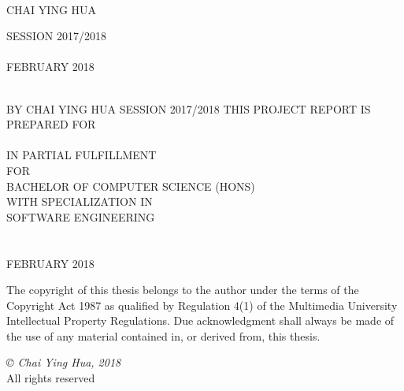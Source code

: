 \documentclass[12pt, oneside]{Thesis}
\begin{document}
\begin{titlepage}
\begin{center}

{\LARGE \ttitle}\\[0.4cm] 
\vfill
\Large{CHAI YING HUA} 

\vfill
\normalsize{SESSION 2017/2018}
\vfill
\normalsize\FACNAME\\
\normalsize \UNIVNAME\\
{\normalsize FEBRUARY 2018}\\ 
\vfill
\end{center}

\end{titlepage}
\thispagestyle{empty}
\begin{center}

	{\LARGE \ttitle}\\[0.4cm] %
	\vfill
	\footnotesize{BY}
	\vfill
	\Large{CHAI YING HUA} %
	\vfill
	\footnotesize{SESSION 2017/2018}
	\vfill
	\footnotesize{THIS PROJECT REPORT IS PREPARED FOR}
	\vfil
	\normalsize\FACNAME\\
	\normalsize \UNIVNAME\\
	\normalsize{IN PARTIAL FULFILLMENT}\\
	\normalsize{FOR}\\
	\vfil
	\normalsize{BACHELOR OF COMPUTER SCIENCE (HONS)}\\
	\normalsize{WITH SPECIALIZATION IN}\\
	\normalsize{SOFTWARE ENGINEERING}\\
	\vfil
	\normalsize\FACNAME\\
	\vfil
	\Large \UNIVNAME\\
	\vfil
	{\normalsize FEBRUARY 2018}\\ %
	\vfill
\end{center}

\newpage
\thispagestyle{empty}

The copyright of this thesis belongs to the author under the terms of the Copyright Act 1987 as qualified by Regulation 4(1) of the Multimedia University Intellectual Property Regulations. Due acknowledgment shall always be made of the use of any material contained in, or derived from, this thesis. 

\vfil
\textit{© Chai Ying Hua, 2018}\\
All rights reserved
\end{document}
